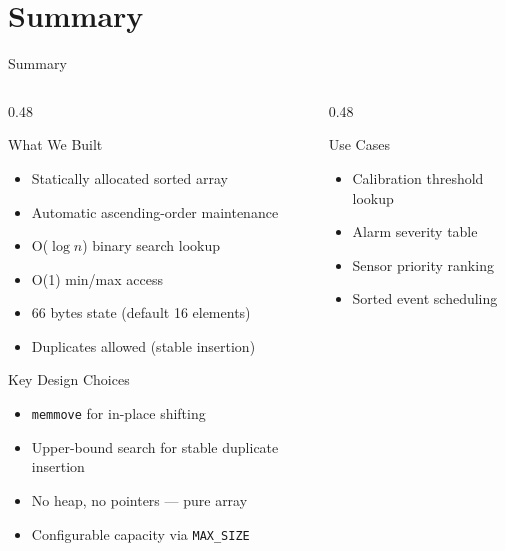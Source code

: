 \documentclass[aspectratio=169, 10pt]{beamer}
\begin{document}
\section{Summary}

\begin{frame}{Summary}
\begin{columns}[T]
\begin{column}{0.48\textwidth}
\begin{block}{What We Built}
\begin{itemize}
  \item Statically allocated sorted array
  \item Automatic ascending-order maintenance
  \item O($\log n$) binary search lookup
  \item O(1) min/max access
  \item 66 bytes state (default 16 elements)
  \item Duplicates allowed (stable insertion)
\end{itemize}
\end{block}

\begin{block}{Key Design Choices}
\begin{itemize}
  \item \texttt{memmove} for in-place shifting
  \item Upper-bound search for stable duplicate insertion
  \item No heap, no pointers --- pure array
  \item Configurable capacity via \texttt{MAX\_SIZE}
\end{itemize}
\end{block}
\end{column}

\begin{column}{0.48\textwidth}
\begin{block}{Use Cases}
\begin{itemize}
  \item Calibration threshold lookup
  \item Alarm severity table
  \item Sensor priority ranking
  \item Sorted event scheduling
\end{itemize}
\end{block}


\end{column}
\end{columns}
\end{frame}
\end{document}
